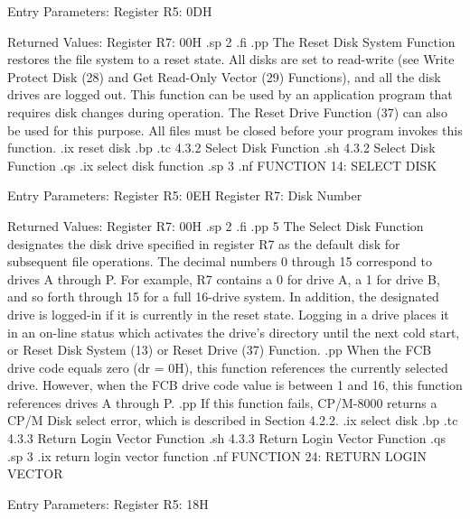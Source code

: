                      Entry Parameters:
                        Register   R5:  0DH

                     Returned  Values:
                        Register   R7:  00H
.sp 2
.fi
.pp
The Reset Disk System Function restores the file system to a reset
state. All disks are set to read-write (see Write Protect Disk 
(28) and Get Read-Only Vector (29) Functions),
and all the disk drives are logged out. This function can be used by
an application program that requires disk changes during
operation.  The Reset Drive Function (37) can also be used for this
purpose. All files must be closed before your program invokes this 
function.
.ix reset disk
.bp
.tc         4.3.2  Select Disk Function
.sh
4.3.2  Select Disk Function
.qs
.ix select disk function
.sp 3
.nf
                    FUNCTION 14:  SELECT DISK

                 Entry Parameters: 
                    Register   R5:  0EH
                    Register   R7:  Disk Number

                 Returned  Values:
                    Register   R7:  00H
.sp 2
.fi
.pp 5
The Select Disk Function designates the disk drive specified in
register   R7 as the default disk for subsequent file operations.
The decimal numbers 0 through 15 correspond to drives A through
P.  For example,   R7 contains a 0 for drive A, a 1 for drive
B, and so forth through 15 for a full 16-drive system.  In
addition, the designated drive is logged-in if it is currently in
the reset state.  Logging in a drive places it in an on-line
status which activates the drive's directory until the next cold
start, or Reset Disk System (13) or Reset Drive (37) Function. 
.pp
When the FCB drive code equals zero (dr = 0H), this function
references the currently selected drive.  However, when the FCB drive code
value is between 1 and 16, this function references drives A through P.  
.pp
If this function fails, CP/M-8000 returns a CP/M Disk select
error, which is described in Section 4.2.2. 
.ix select disk
.bp
.tc         4.3.3  Return Login Vector Function
.sh
4.3.3  Return Login Vector Function
.qs
.sp 3
.ix return login vector function
.nf
                FUNCTION 24:  RETURN LOGIN VECTOR

                 Entry Parameters:
                    Register   R5:  18H

